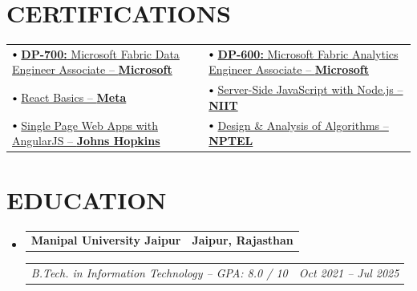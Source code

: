 \documentclass[10pt,letterpaper]{article}
\makeatletter
\newcommand{\headerrow}[2]
{\begin{tabular*}{\linewidth}{l@{\extracolsep{\fill}}r}
#1 &
#2 \\
\end{tabular*}}
\newcommand{\resumeSubHeadingListStart}{\begin{itemize}[leftmargin=0.0in, label={}, topsep=0pt, partopsep=0pt, parsep=0pt, itemsep=2pt]}
\newcommand{\resumeSubHeadingListEnd}{\end{itemize}}
\newcommand\sbullet[1][.5]{\mathbin{\vcenter{\hbox{\scalebox{#1}{$\bullet$}}}}}
\makeatother
\begin{document}
\section{CERTIFICATIONS}
\vspace{-0.1cm}
\begin{tabularx}{\linewidth}{X X}

$\sbullet[.75]$
\href{https://learn.microsoft.com/en-us/users/adarshdevashishmaqsoftware-5603/credentials/fc31c96f7ab6f23}
{\textbf{DP-700:} Microsoft Fabric Data Engineer Associate -- \textbf{Microsoft}}
&
$\sbullet[.75]$
\href{https://learn.microsoft.com/en-us/users/adarshdevashishmaqsoftware-5603/credentials/86d36a7e40932fe3}
{\textbf{DP-600:} Microsoft Fabric Analytics Engineer Associate -- \textbf{Microsoft}} \\

$\sbullet[.75]$
\href{https://coursera.org/share/102fd6ff3a9901d78a7355a8e583c3fe}
{React Basics -- \textbf{Meta}}
&
$\sbullet[.75]$
\href{https://coursera.org/share/1b8adc4b592aa9cff68a07e3e8d21e73}
{Server-Side JavaScript with Node.js -- \textbf{NIIT}} \\

$\sbullet[.75]$
\href{https://coursera.org/share/5a5cc3e88f7195b816a7db0f8933ad6a}
{Single Page Web Apps with AngularJS -- \textbf{Johns Hopkins}}
&
$\sbullet[.75]$
\href{https://drive.google.com/file/d/17pIxQeNun41oPVjAtsRZs9zZMkErOfo9/view?usp=sharing}
{Design \& Analysis of Algorithms -- \textbf{NPTEL}} \\

\end{tabularx}


\vspace{-0.1cm}

\section{EDUCATION}
\vspace{-0.1cm}
\resumeSubHeadingListStart
    \item
        \headerrow
        {\textbf{Manipal University Jaipur}}
        {\textbf{Jaipur, Rajasthan}}
        \headerrow
        {\emph{B.Tech. in Information Technology -- GPA: 8.0 / 10}}
        {\emph{Oct 2021 -- Jul 2025}}
\resumeSubHeadingListEnd
\end{document}
